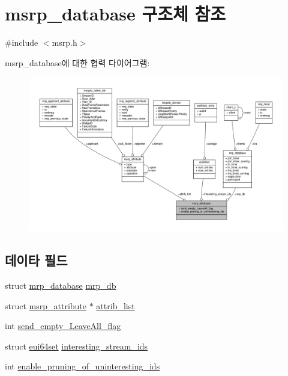 \hypertarget{structmsrp__database}{}\section{msrp\+\_\+database 구조체 참조}
\label{structmsrp__database}


{\ttfamily \#include $<$msrp.\+h$>$}



msrp\+\_\+database에 대한 협력 다이어그램\+:
\nopagebreak
\begin{figure}[H]
\begin{center}
\leavevmode
\includegraphics[width=350pt]{structmsrp__database__coll__graph}
\end{center}
\end{figure}
\subsection*{데이타 필드}
\begin{DoxyCompactItemize}
\item 
struct \hyperlink{structmrp__database}{mrp\+\_\+database} \hyperlink{structmsrp__database_a7e08db3b85c932325ce3a3605a09ab0c}{mrp\+\_\+db}
\item 
struct \hyperlink{structmsrp__attribute}{msrp\+\_\+attribute} $\ast$ \hyperlink{structmsrp__database_a171377a96c019410091ac2838ea2be82}{attrib\+\_\+list}
\item 
int \hyperlink{structmsrp__database_a5c551b6ff3976e96ec18e69b0706a532}{send\+\_\+empty\+\_\+\+Leave\+All\+\_\+flag}
\item 
struct \hyperlink{structeui64set}{eui64set} \hyperlink{structmsrp__database_a116b6f6befbaedf09d11f7c09a1f24e8}{interesting\+\_\+stream\+\_\+ids}
\item 
int \hyperlink{structmsrp__database_a9134b5b401b0a77d3be7d4b3cbb27294}{enable\+\_\+pruning\+\_\+of\+\_\+uninteresting\+\_\+ids}
\end{DoxyCompactItemize}


